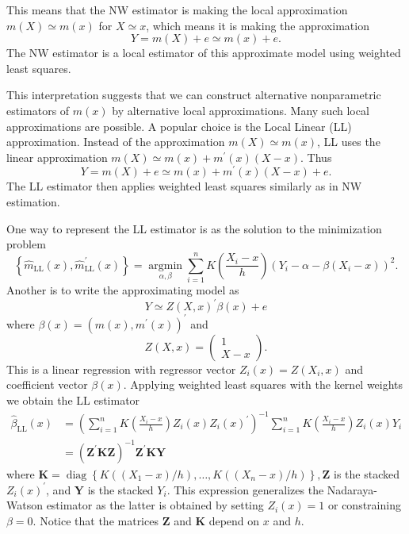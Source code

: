 \documentclass[10pt]{article}
\begin{document}
This means that the NW estimator is making the local approximation $m(X) \simeq m(x)$ for $X \simeq x$, which means it is making the approximation
$$
Y=m(X)+e \simeq m(x)+e .
$$
The NW estimator is a local estimator of this approximate model using weighted least squares.

This interpretation suggests that we can construct alternative nonparametric estimators of $m(x)$ by alternative local approximations. Many such local approximations are possible. A popular choice is the Local Linear (LL) approximation. Instead of the approximation $m(X) \simeq m(x)$, LL uses the linear approximation $m(X) \simeq m(x)+m^{\prime}(x)(X-x)$. Thus
$$
Y=m(X)+e \simeq m(x)+m^{\prime}(x)(X-x)+e .
$$
The LL estimator then applies weighted least squares similarly as in NW estimation.

One way to represent the LL estimator is as the solution to the minimization problem
$$
\left\{\widehat{m}_{\mathrm{LL}}(x), \widehat{m}_{\mathrm{LL}}^{\prime}(x)\right\}=\underset{\alpha, \beta}{\operatorname{argmin}} \sum_{i=1}^{n} K\left(\frac{X_{i}-x}{h}\right)\left(Y_{i}-\alpha-\beta\left(X_{i}-x\right)\right)^{2} .
$$
Another is to write the approximating model as
$$
Y \simeq Z(X, x)^{\prime} \beta(x)+e
$$
where $\beta(x)=\left(m(x), m^{\prime}(x)\right)^{\prime}$ and
$$
Z(X, x)=\left(\begin{array}{c}
1 \\
X-x
\end{array}\right) .
$$
This is a linear regression with regressor vector $Z_{i}(x)=Z\left(X_{i}, x\right)$ and coefficient vector $\beta(x)$. Applying weighted least squares with the kernel weights we obtain the LL estimator
$$
\begin{aligned}
\widehat{\beta}_{\mathrm{LL}}(x) &=\left(\sum_{i=1}^{n} K\left(\frac{X_{i}-x}{h}\right) Z_{i}(x) Z_{i}(x)^{\prime}\right)^{-1} \sum_{i=1}^{n} K\left(\frac{X_{i}-x}{h}\right) Z_{i}(x) Y_{i} \\
&=\left(\boldsymbol{Z}^{\prime} \boldsymbol{K} \boldsymbol{Z}\right)^{-1} \boldsymbol{Z}^{\prime} \boldsymbol{K} \boldsymbol{Y}
\end{aligned}
$$
where $\boldsymbol{K}=\operatorname{diag}\left\{K\left(\left(X_{1}-x\right) / h\right), \ldots, K\left(\left(X_{n}-x\right) / h\right)\right\}, \boldsymbol{Z}$ is the stacked $Z_{i}(x)^{\prime}$, and $\boldsymbol{Y}$ is the stacked $Y_{i}$. This expression generalizes the Nadaraya-Watson estimator as the latter is obtained by setting $Z_{i}(x)=1$ or constraining $\beta=0$. Notice that the matrices $\boldsymbol{Z}$ and $\boldsymbol{K}$ depend on $x$ and $h$.
\end{document}
